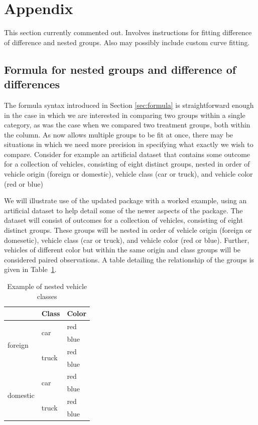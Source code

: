 \section{Appendix}

This section currently commented out. Involves instructions for fitting difference of difference and nested groups. Also may possibly include custom curve fitting.

%

\subsection{Formula for nested groups and difference of differences} 

The formula syntax introduced in Section \ref{sec:formula} is straightforward enough in the case in which we are interested in comparing two groups within a single category, as was the case when we compared two treatment groups, both within the  column. As  now allows multiple groups to be fit at once, there may be situations in which we need more precision in specifying what exactly we wish to compare. Consider for example an artificial dataset that contains some outcome  for a collection of vehicles, consisting of eight distinct groups, nested in order of vehicle origin (foreign or domestic), vehicle class (car or truck), and vehicle color (red or blue)

We will illustrate use of the updated  package with a worked example, using an artificial dataset to help detail some of the newer aspects of the package. The dataset will consist of outcomes for a collection of vehicles, consisting of eight distinct groups. These groups will be nested in order of vehicle origin (foreign or domesetic), vehicle class (car or truck), and vehicle color (red or blue). Further, vehicles of different color but within the same origin and class groups will be considered paired observations. A table detailing the relationship of the groups is given in Table~\ref{tab:vehicle}.

\begin{table}[H]
\centering
\def\arraystretch{1.5}
\begin{tabular}{|p{0.9in}|p{0.9in}|p{0.9in}|} \hline 
\rowcolor{lightgray} \multicolumn{1}{|c|}{Origin} & \multicolumn{1}{c|}{Class} & \multicolumn{1}{c|}{Color}\\
\hline
\multirow{4}{*}{foreign} & \multirow{2}{*}{car} & red \\
\hhline{~~-}
& & blue \\
\hhline{~--}
& \multirow{2}{*}{truck} & red \\
\hhline{~~-}
& & blue \\
\hline
\multirow{4}{*}{domestic} & \multirow{2}{*}{car} & red \\
\hhline{~~-}
& & blue \\
\hhline{~--}
& \multirow{2}{*}{truck} & red \\
\hhline{~~-}
& & blue \\
\hline
\end{tabular}
\caption{Example of nested vehicle classes}
\label{tab:vehicle}
\end{table}


